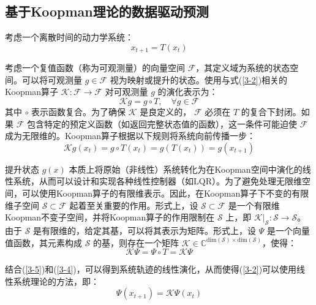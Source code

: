 \documentclass[lang=chs, degree=master, blindreview=false, winfonts=true]{yanputhesis}
\begin{document}
\subsection{基于Koopman理论的数据驱动预测}

考虑一个离散时间的动力学系统：
\begin{equation}
	x_{t+1} = T(x_t)\label{3-2}
\end{equation}

考虑一个复值函数（称为可观测量）的向量空间 \( \mathcal{F} \)，其定义域为系统的状态空间。可以将可观测量 \( g \in \mathcal{F} \) 视为映射或提升的状态。使用与式(\ref{3-2})相关的Koopman算子 \( \mathcal{K}: \mathcal{F} \to \mathcal{F} \) 对可观测量 \( g \) 的演化表示为：
\begin{equation}
	\mathcal{K}g = g \circ T, \quad \forall g \in \mathcal{F}
	\label{3-3}
\end{equation}
其中 \( \circ \) 表示函数复合。为了确保 \( \mathcal{K} \) 是良定义的， \( \mathcal{F} \) 必须在 \( T \) 的复合下封闭。如果 \( \mathcal{F} \) 包含特定的预定义函数（如返回完整状态值的函数），这一条件可能迫使 \( \mathcal{F} \) 成为无限维的。Koopman算子根据以下规则将系统向前传播一步：
\begin{equation}
	\mathcal{K}g(x_t) = g \circ T(x_t) = g(T(x_t)) = g(x_{t+1})
	\label{3-4}
\end{equation}

提升状态 \( g(x) \) 本质上将原始（非线性）系统转化为在Koopman空间中演化的线性系统，从而可以设计和实现各种线性控制器（如LQR）。为了避免处理无限维空间，可以使用Koopman算子的有限维表示。因此，在Koopman算子下不变的有限维子空间 \( \mathcal{S} \subset \mathcal{F} \) 起着至关重要的作用。形式上，设 \( \mathcal{S} \subset \mathcal{F} \) 是一个有限维Koopman不变子空间，并将Koopman算子的作用限制在 \( \mathcal{S} \) 上，即 \( \mathcal{K} \rvert_\mathcal{S}: \mathcal{S} \to \mathcal{S} \)。由于 \( \mathcal{S} \) 是有限维的，给定其基，可以将其表示为矩阵。形式上，设 \( \Psi \) 是一个向量值函数，其元素构成 \( \mathcal{S} \) 的基，则存在一个矩阵 \( \mathcal{K} \in \mathbb{C}^{\text{dim}(\mathcal{S}) \times \text{dim}(\mathcal{S})} \)，使得：
\begin{equation}
	\mathcal{K}\Psi = \Psi \circ T = \mathcal{K}\Psi
	\label{3-5}
\end{equation}

结合(\ref{3-5})和(\ref{3-4})，可以得到系统轨迹的线性演化，从而使得(\ref{3-2})可以使用线性系统理论的方法，即：
\begin{equation}
	\Psi(x_{t+1}) = \mathcal{K}\Psi(x_t)\label{3-6}
\end{equation}
\end{document}
